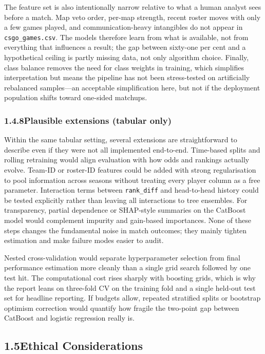 \documentclass[12pt,a4paper]{article}
\begin{document}
The feature set is also intentionally narrow relative to what a human analyst sees before a match. Map veto order, per-map strength, recent roster moves with only a few games played, and communication-heavy intangibles do not appear in \texttt{csgo\_games.csv}. The models therefore learn from what is available, not from everything that influences a result; the gap between sixty-one per cent and a hypothetical ceiling is partly missing data, not only algorithm choice. Finally, class balance removes the need for class weights in training, which simplifies interpretation but means the pipeline has not been stress-tested on artificially rebalanced samples---an acceptable simplification here, but not if the deployment population shifts toward one-sided matchups.

\subsubsection{1.4.8\quad Plausible extensions (tabular only)}

Within the same tabular setting, several extensions are straightforward to describe even if they were not all implemented end-to-end. Time-based splits and rolling retraining would align evaluation with how odds and rankings actually evolve. Team-ID or roster-ID features could be added with strong regularisation to pool information across seasons without treating every player column as a free parameter. Interaction terms between \texttt{rank\_diff} and head-to-head history could be tested explicitly rather than leaving all interactions to tree ensembles. For transparency, partial dependence or SHAP-style summaries on the CatBoost model would complement impurity and gain-based importances. None of these steps changes the fundamental noise in match outcomes; they mainly tighten estimation and make failure modes easier to audit.

Nested cross-validation would separate hyperparameter selection from final performance estimation more cleanly than a single grid search followed by one test hit. The computational cost rises sharply with boosting grids, which is why the report leans on three-fold CV on the training fold and a single held-out test set for headline reporting. If budgets allow, repeated stratified splits or bootstrap optimism correction would quantify how fragile the two-point gap between CatBoost and logistic regression really is.

\subsection{1.5\quad Ethical Considerations}
\end{document}
